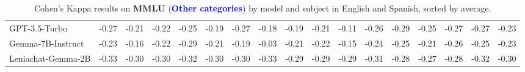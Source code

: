 \begin{table*}[ht]
{\begin{tabular}{lcccccccccccccccc}
GPT-3.5-Turbo & -0.27 & -0.21 & -0.22 & -0.25 & -0.19 & -0.27 & -0.18 & -0.19 & -0.21 & -0.11 & -0.26 & -0.29 & -0.25 & -0.27 & -0.27 & -0.23 \\
Gemma-7B-Instruct & -0.23 & -0.16 & -0.22 & -0.29 & -0.21 & -0.19 & -0.03 & -0.21 & -0.22 & -0.15 & -0.24 & -0.25 & -0.21 & -0.26 & -0.25 & -0.23 \\
Leniachat-Gemma-2B & -0.33 & -0.30 & -0.30 & -0.32 & -0.30 & -0.30 & -0.33 & -0.29 & -0.29 & -0.29 & -0.31 & -0.28 & -0.27 & -0.28 & -0.32 & -0.30 \\
\bottomrule
\end{tabular}
}

\caption{Cohen's Kappa results on \textbf{MMLU} (\textbf{\textcolor{blue}{Other categories}}) by model and subject in English and Spanish, sorted by average.}
\label{tablammlu4}
\end{table*}